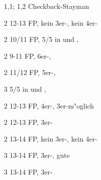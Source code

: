 \begin{appendix}
\bdsc
\item[1\ufa{}\sep1\pik; 1\SA{}\sep2\tre] Checkback-Stayman
 \bdsc
 \item[2\kar] 12-13\bad{} FP, kein 3er-\pi, kein 4er-\co
  \bdsc
  \item[2\coe] 10/11 FP, 5/5 in \co und \pi, \nf
  \item[2\pik] 9-11 FP, 6er-\pi, \nf
  \item[2\SA] 11/12 FP, 5er-\pi, \nf
  \item[3\coe] 5/5 in \co und \pi, \slamint
  \edsc
 \item[2\coe] 12-13\bad{} FP, 4er-\co, 3er-\pi m"oglich
 \item[2\pik] 12-13\bad{} FP, 3er-\pi
 \item[2\SA]  13\good{}-14 FP, kein 3er-\pi, kein 4er-\co
 \item[3\ufa] 13\good{}-14 FP, 3er-\pi, gute \ufa
 \item[3\pik] 13\good{}-14 FP, 3er-\pi
 \edsc
\edsc






\end{appendix}



